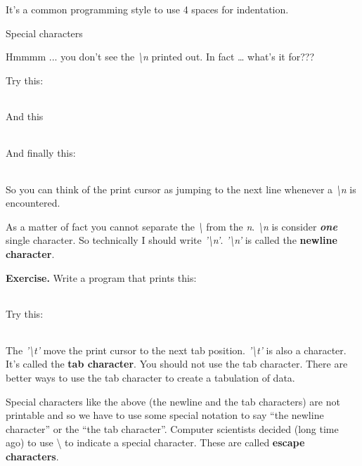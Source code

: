 \documentclass[
]{article}
\begin{document}
\begin{longtable}[]{@{}@{}}
\toprule
\endhead
\bottomrule
\end{longtable}

It's a common programming style to use 4 spaces for indentation.

Special characters

Hmmmm ... you don't see the \emph{\textbackslash n} printed out. In fact
\ldots{} what's it for???

Try this:

\begin{longtable}[]{@{}@{}}
\toprule
\endhead
\bottomrule
\end{longtable}

And this

\begin{longtable}[]{@{}@{}}
\toprule
\endhead
\bottomrule
\end{longtable}

And finally this:

\begin{longtable}[]{@{}@{}}
\toprule
\endhead
\bottomrule
\end{longtable}

So you can think of the print cursor as jumping to the next line
whenever a \emph{\textbackslash n} is encountered.

As a matter of fact you cannot separate the \emph{\textbackslash{}} from
the \emph{n}. \emph{\textbackslash n} is consider \emph{\textbf{one}}
single character. So technically I should write
\emph{'\textbackslash n'}. \emph{'\textbackslash n'} is called the
\textbf{newline character}.

\textbf{Exercise.} Write a program that prints this:

\begin{longtable}[]{@{}@{}}
\toprule
\endhead
\bottomrule
\end{longtable}

Try this:

\begin{longtable}[]{@{}@{}}
\toprule
\endhead
\bottomrule
\end{longtable}

The \emph{'\textbackslash t'} move the print cursor to the next tab
position. \emph{'\textbackslash t'} is also a character. It's called the
\textbf{tab character}. You should not use the tab character. There are
better ways to use the tab character to create a tabulation of data.

Special characters like the above (the newline and the tab characters)
are not printable and so we have to use some special notation to say
``the newline character'' or the ``the tab character''. Computer
scientists decided (long time ago) to use \textbackslash{} to indicate a
special character. These are called \textbf{escape characters}.
\end{document}
